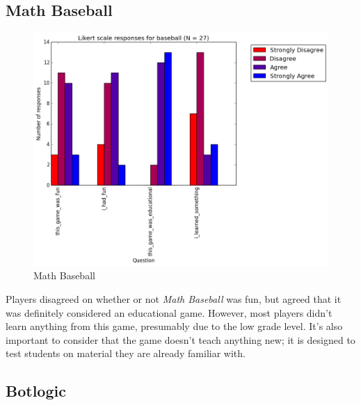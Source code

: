 			\subsection{Math Baseball}

				\begin{figure}[] 
				\centering 
				\includegraphics[width=\textwidth, height=.4\textheight, keepaspectratio=true]{baseball_likert.png} 
				\caption{Math Baseball}
				\end{figure}

				Players disagreed on whether or not \textit{Math Baseball} was fun, but agreed that it was definitely considered an educational game. However, most players didn't learn anything from this game, presumably due to the low grade level. It's also important to consider that the game doesn't teach anything new; it is designed to test students on material they are already familiar with.

			\subsection{Botlogic}

